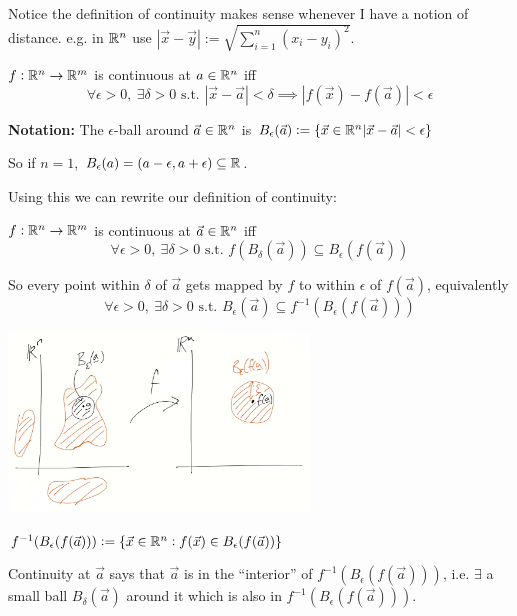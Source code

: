 \documentclass[10pt,twoside]{scrartcl}
\begin{document}
Notice 
 the definition of continuity makes sense whenever I have a notion of distance.  e.g. in $\mathbb{R}^n$ use $|\vec{x} - \vec{y}| := \sqrt{\sum_{i=1}^n (x_i - y_i)^2}$.\\

\begin{definition}
$f: \mathbb{R}^n \to \mathbb{R}^m$ is continuous at $a \in \mathbb{R}^n$ iff 
\[\forall \epsilon >0,~\exists \delta >0 \text{ s.t. } |\vec{x} - \vec{a}| < \delta \implies |f(\vec{x}) - f(\vec{a})| < \epsilon\]	
\end{definition}

\textbf{Notation:} The $\epsilon$-ball around $\vec{a}\in\mathbb{R}^n$ is $B_\epsilon(\vec{a}) := \{\vec{x} \in \mathbb{R}^n |\vec{x} - \vec{a}| < \epsilon\}$

So if $n = 1$, $B_\epsilon(a) = (a-\epsilon, a + \epsilon) \subseteq \mathbb{R}$. 

Using this we can rewrite our definition of continuity:\\

\begin{definition}
$f: \mathbb{R}^n \to \mathbb{R}^m$ is continuous at $\vec{a} \in \mathbb{R}^n$ iff 
\[\forall \epsilon > 0,~\exists \delta > 0 \text{ s.t. } f(B_\delta(\vec{a})) \subseteq B_\epsilon(f(\vec{a}))\]	
\end{definition}

So every point within $\delta$ of $\vec{a}$ gets mapped by $f$ to within $\epsilon$ of $f(\vec{a})$, equivalently 
\[\boxed{\forall \epsilon > 0,~\exists \delta > 0 \text{ s.t. } B_\epsilon(\vec{a}) \subseteq f^{-1}(B_\epsilon(f(\vec{a})))}\]


\begin{center}
\includegraphics[width = 8cm]{ball1.jpg}
\end{center}


$f^{-1}(B_\epsilon(f(\vec{a}))) := \{\vec{x} \in \mathbb{R}^n : f(\vec{x}) \in B_\epsilon (f(\vec{a}))\}$

Continuity at $\vec{a}$ says that $\vec{a}$ is in the ``interior'' of $f^{-1}(B_\epsilon (f(\vec{a})))$, i.e. $\exists$ a small ball $B_\delta (\vec{a})$ around it which is also in $f^{-1}(B_\epsilon(f(\vec{a})))$. 
\end{document}
